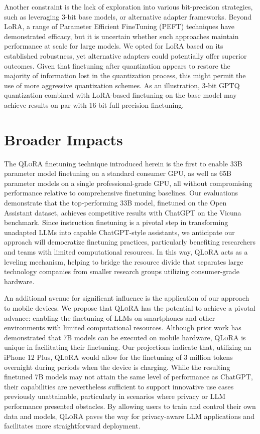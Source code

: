 Another constraint is the lack of exploration into various bit-precision strategies, such as leveraging 3-bit base models, or alternative adapter frameworks. Beyond LoRA, a range of Parameter Efficient FineTuning (PEFT) techniques have demonstrated efficacy, but it is uncertain whether such approaches maintain performance at scale for large models. We opted for LoRA based on its established robustness, yet alternative adapters could potentially offer superior outcomes. Given that finetuning after quantization appears to restore the majority of information lost in the quantization process, this might permit the use of more aggressive quantization schemes. As an illustration, 3-bit GPTQ quantization combined with LoRA-based finetuning on the base model may achieve results on par with 16-bit full precision finetuning.

\section{Broader Impacts}

The \textsc{QLoRA} finetuning technique introduced herein is the first to enable 33B parameter model finetuning on a standard consumer GPU, as well as 65B parameter models on a single professional-grade GPU, all without compromising performance relative to comprehensive finetuning baselines. Our evaluations demonstrate that the top-performing 33B model, finetuned on the Open Assistant dataset, achieves competitive results with ChatGPT on the Vicuna benchmark. Since instruction finetuning is a pivotal step in transforming unadapted LLMs into capable ChatGPT-style assistants, we anticipate our approach will democratize finetuning practices, particularly benefiting researchers and teams with limited computational resources. In this way, \textsc{QLoRA} acts as a leveling mechanism, helping to bridge the resource divide that separates large technology companies from smaller research groups utilizing consumer-grade hardware.

An additional avenue for significant influence is the application of our approach to mobile devices. We propose that \textsc{QLoRA} has the potential to achieve a pivotal advance: enabling the finetuning of LLMs on smartphones and other environments with limited computational resources. Although prior work has demonstrated that 7B models can be executed on mobile hardware, \textsc{QLoRA} is unique in facilitating their finetuning. Our projections indicate that, utilizing an iPhone 12 Plus, \textsc{QLoRA} would allow for the finetuning of 3 million tokens overnight during periods when the device is charging. While the resulting finetuned 7B models may not attain the same level of performance as ChatGPT, their capabilities are nevertheless sufficient to support innovative use cases previously unattainable, particularly in scenarios where privacy or LLM performance presented obstacles. By allowing users to train and control their own data and models, \textsc{QLoRA} paves the way for privacy-aware LLM applications and facilitates more straightforward deployment.

